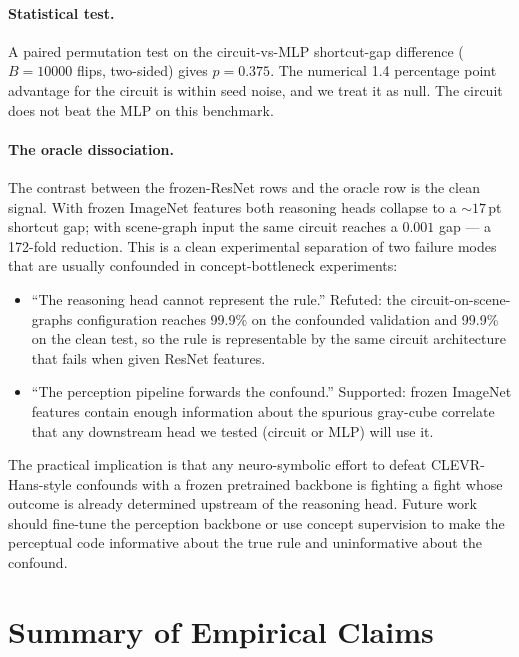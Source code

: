 \documentclass{article}
\begin{document}
\paragraph{Statistical test.}
A paired permutation test on the circuit-vs-MLP shortcut-gap difference ($B = 10000$ flips, two-sided) gives $p = 0.375$.
The numerical 1.4 percentage point advantage for the circuit is within seed noise, and we treat it as null.
The circuit does not beat the MLP on this benchmark.

\paragraph{The oracle dissociation.}
The contrast between the frozen-ResNet rows and the oracle row is the clean signal.
With frozen ImageNet features both reasoning heads collapse to a $\sim 17$\,pt shortcut gap; with scene-graph input the same circuit reaches a $0.001$ gap --- a 172-fold reduction.
This is a clean experimental separation of two failure modes that are usually confounded in concept-bottleneck experiments:
\begin{itemize}
  \item ``The reasoning head cannot represent the rule.'' Refuted: the circuit-on-scene-graphs configuration reaches 99.9\% on the confounded validation and 99.9\% on the clean test, so the rule is representable by the same circuit architecture that fails when given ResNet features.
  \item ``The perception pipeline forwards the confound.'' Supported: frozen ImageNet features contain enough information about the spurious gray-cube correlate that any downstream head we tested (circuit or MLP) will use it.
\end{itemize}
The practical implication is that any neuro-symbolic effort to defeat CLEVR-Hans-style confounds with a frozen pretrained backbone is fighting a fight whose outcome is already determined upstream of the reasoning head.
Future work should fine-tune the perception backbone or use concept supervision to make the perceptual code informative about the true rule and uninformative about the confound.

\section{Summary of Empirical Claims}
\label{sec:claims}
\end{document}
